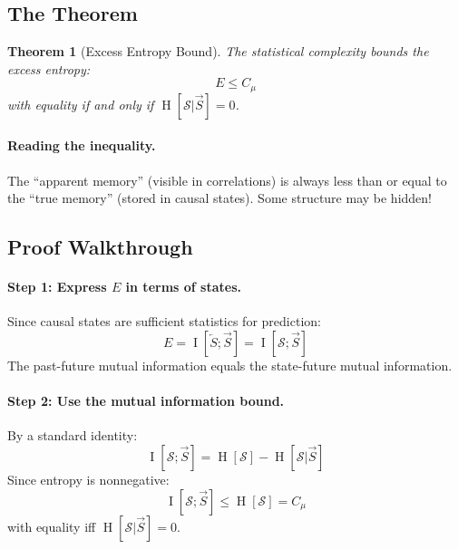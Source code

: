 \documentclass[11pt,a4paper]{article}
\theoremstyle{definition}
\theoremstyle{plain}
\newtheorem{theorem}{Theorem}[section]
\newcommand{\Cmu}{C_\mu}
\newcommand{\calS}{\mathcal{S}}
\newcommand{\Past}{\overleftarrow{S}}
\newcommand{\Future}{\overrightarrow{S}}
\DeclareMathOperator{\Ent}{H}
\DeclareMathOperator{\MI}{I}
\begin{document}
\subsection{The Theorem}

\begin{theorembox}[title=Theorem 5: The Bound~\cite{shalizi2001computational}]
\begin{theorem}[Excess Entropy Bound]
\label{thm:bound}
The statistical complexity bounds the excess entropy:
\begin{equation}
    E \leq \Cmu
\end{equation}
with equality if and only if $\Ent[\calS | \Future] = 0$.
\end{theorem}
\end{theorembox}

\paragraph{Reading the inequality.} The ``apparent memory'' (visible in correlations) is always less than or equal to the ``true memory'' (stored in causal states). Some structure may be hidden!

\subsection{Proof Walkthrough}

\paragraph{Step 1: Express $E$ in terms of states.}
Since causal states are sufficient statistics for prediction:
\begin{equation}
    E = \MI[\Past; \Future] = \MI[\calS; \Future]
\end{equation}
The past-future mutual information equals the state-future mutual information.

\paragraph{Step 2: Use the mutual information bound.}
By a standard identity:
\begin{equation}
    \MI[\calS; \Future] = \Ent[\calS] - \Ent[\calS | \Future]
\end{equation}
Since entropy is nonnegative:
\begin{equation}
    \MI[\calS; \Future] \leq \Ent[\calS] = \Cmu
\end{equation}
with equality iff $\Ent[\calS | \Future] = 0$.
\end{document}

